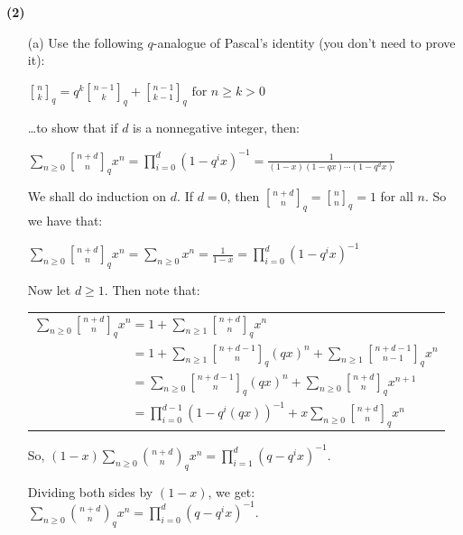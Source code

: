 \documentclass{book}
\newcommand{\exOne}{%
   \color{Purple}%
   \fontsize{13}{15}\selectfont%
}
\newenvironment{myIndent}{%
   \begin{adjustwidth}{2.5em}{0em}%
}{%
   \end{adjustwidth}%
}
\newcommand{\blab}[1]{\textbf{#1}}
\newcommand{\qbinom}{\genfrac{[}{]}{0pt}{}}
\newcommand{\retTwo}{\hfill\bigbreak}
\begin{document}
\blab{(2)}
\begin{enumerate}
   \item[(a)] Use the following $q$-analogue of Pascal's identity (you don't need to prove it):
   
   {\centering$\qbinom{n}{k}_q = q^k\qbinom{n-1}{k}_q + \qbinom{n-1}{k-1}_q \text{ for } n \geq k > 0$\retTwo\par}

   \dots to show that if $d$ is a nonnegative integer, then:

   {\centering$\sum\limits_{n\geq 0}\qbinom{n+d}{n}_q x^n = \prod\limits_{i = 0}^d (1 - q^i x)^{-1} = \frac{1}{(1-x)(1-qx)\cdots(1-q^dx)}$\retTwo\par}

   \begin{myIndent}\exOne
      We shall do induction on $d$. If $d = 0$, then $\qbinom{n+d}{n}_q = \qbinom{n}{n}_q = 1$ for all $n$. So we have that:\\ [-24pt]
      
      {\centering $\sum\limits_{n\geq 0}\qbinom{n+d}{n}_q x^n = \sum\limits_{n \geq 0} x^n = \frac{1}{1 - x} = \prod\limits_{i=0}^d(1-q^ix)^{-1}$ \retTwo\par}

      Now let $d \geq 1$. Then note that:\newpage

      {\centering 
      \begin{tabular}{l}
         $\sum\limits_{n \geq 0}\qbinom{n+d}{n}_q x^n = 1 + \sum\limits_{n \geq 1}\qbinom{n+d}{n}_q x^n$ \\ [12pt]
         $\phantom{\sum\limits_{n \geq 0}\qbinom{n+d}{n}_q x^n} = 1 + \sum\limits_{n \geq 1}\qbinom{n+d-1}{n}_q(qx)^n + \sum\limits_{n \geq 1}\qbinom{n+d-1}{n-1}_qx^n$\\ [12pt]
         $\phantom{\sum\limits_{n \geq 0}\qbinom{n+d}{n}_q x^n} = \sum\limits_{n \geq 0}\qbinom{n+d-1}{n}_q(qx)^n + \sum\limits_{n \geq 0}\qbinom{n+d}{n}_qx^{n+1}$\\ [12pt]
         $\phantom{\sum\limits_{n \geq 0}\qbinom{n+d}{n}_q x^n} = \prod\limits_{i = 0}^{d-1}(1-q^i(qx))^{-1} + x\sum\limits_{n \geq 0}\qbinom{n+d}{n}_qx^{n}$
      \end{tabular}\retTwo\par}

      So, $(1 - x)\sum\limits_{n \geq 0}\binom{n+d}{n}_q x^n = \prod\limits_{i = 1}^d(q - q^i x)^{-1}$.\retTwo

      Dividing both sides by $(1 - x)$, we get: $\sum\limits_{n \geq 0}\binom{n+d}{n}_q x^n = \prod\limits_{i = 0}^d(q - q^i x)^{-1}$.\retTwo
   \end{myIndent}


\end{enumerate}
\end{document}
